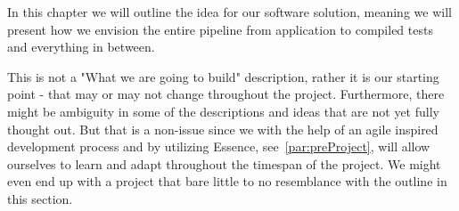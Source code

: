 In this chapter we will outline the idea for our software solution, meaning we will present how we envision the entire pipeline from application to compiled tests and everything in between.

This is not a "What we are going to build" description, rather it is our starting point - that may or may not change throughout the project.
Furthermore, there might be ambiguity in some of the descriptions and ideas that are not yet fully thought out.
But that is a non-issue since we with the help of an agile inspired development process and by utilizing Essence, see~\autoref{par:preProject}, will allow ourselves to learn and adapt throughout the timespan of the project.
We might even end up with a project that bare little to no resemblance with the outline in this section.
